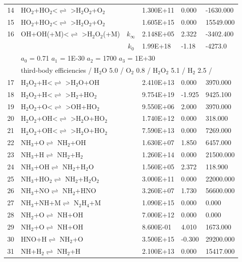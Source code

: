 \documentclass[11pt]{article}
\begin{document}
\begin{table}[hbt]
\begin{tabular}{|r l c l l l|}
14 &	HO$_{2}$+HO$_{2}$<$\rightleftharpoons$ >H$_{2}$O$_{2}$+O$_{2}$&	&	1.300E+11&	0.000&	-1630.000\\ 
15 &	HO$_{2}$+HO$_{2}$<$\rightleftharpoons$ >H$_{2}$O$_{2}$+O$_{2}$&	&	1.605E+15&	0.000&	15549.000\\ 
16 &	OH+OH(+M)<$\rightleftharpoons$ >H$_{2}$O$_{2}$(+M)&	$k_{\infty}$&	2.148E+05&	2.322&	-3402.400\\ 
	&	&	$k_0$&	1.99E+18&-1.18&	-4273.0\\ 
	&\multicolumn{5}{l|}{	$a_0$ = 0.71	$a_1$ = 1E-30	$a_2$ = 1700	$a_3$ = 1E+30}\\ 
	&\multicolumn{5}{l|}{third-body efficiencies  / H$_{2}$O 5.0 / O$_{2}$ 0.8 / H$_{2}$O$_{2}$ 5.1 / H$_{2}$ 2.5 /}\\ 
17 &	H$_{2}$O$_{2}$+H<$\rightleftharpoons$ >H$_{2}$O+OH&	&	2.410E+13&	0.000&	3970.000\\ 
18 &	H$_{2}$O$_{2}$+H<$\rightleftharpoons$ >H$_{2}$+HO$_{2}$&	&	9.754E+19&	-1.925&	9425.100\\ 
19 &	H$_{2}$O$_{2}$+O<$\rightleftharpoons$ >OH+HO$_{2}$&	&	9.550E+06&	2.000&	3970.000\\ 
20 &	H$_{2}$O$_{2}$+OH<$\rightleftharpoons$ >H$_{2}$O+HO$_{2}$&	&	1.740E+12&	0.000&	318.000\\ 
21 &	H$_{2}$O$_{2}$+OH<$\rightleftharpoons$ >H$_{2}$O+HO$_{2}$&	&	7.590E+13&	0.000&	7269.000\\ 
22 &	NH$_{3}$+O$\rightleftharpoons$ NH$_{2}$+OH&	&	1.630E+07&	1.850&	6457.000\\ 
23 &	NH$_{3}$+H$\rightleftharpoons$ NH$_{2}$+H$_{2}$&	&	1.260E+14&	0.000&	21500.000\\ 
24 &	NH$_{3}$+OH$\rightleftharpoons$ NH$_{2}$+H$_{2}$O&	&	1.560E+05&	2.372&	118.900\\ 
25 &	NH$_{3}$+HO$_{2}$$\rightleftharpoons$ NH$_{2}$+H$_{2}$O$_{2}$&	&	3.000E+11&	0.000&	22000.000\\ 
26 &	NH$_{3}$+NO$\rightleftharpoons$ NH$_{2}$+HNO&	&	3.260E+07&	1.730&	56600.000\\ 
27 &	NH$_{3}$+NH+M$\rightleftharpoons$ N$_{2}$H$_{4}$+M&	&	1.090E+15&	0.000&	0.000\\ 
28 &	NH$_{2}$+O$\rightleftharpoons$ NH+OH&	&	7.000E+12&	0.000&	0.000\\ 
29 &	NH$_{2}$+O$\rightleftharpoons$ NH+OH&	&	8.600E-01&	4.010&	1673.000\\ 
30 &	HNO+H$\rightleftharpoons$ NH$_{2}$+O&	&	3.500E+15&	-0.300&	29200.000\\ 
31 &	NH+H$_{2}$$\rightleftharpoons$ NH$_{2}$+H&	&	2.100E+13&	0.000&	15417.000\\ 

\end{tabular}
\end{table}
\end{document}
